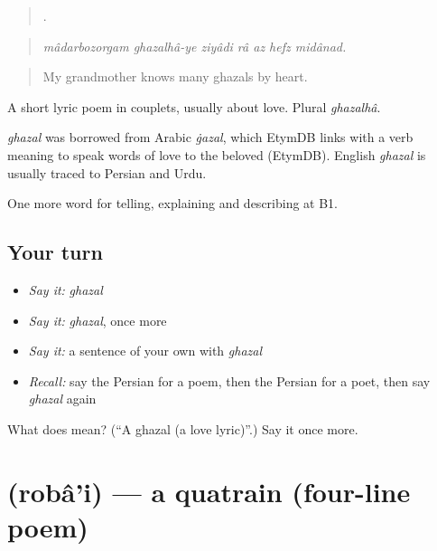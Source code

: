 \begin{quote}
      .
\end{quote}

\begin{quote}
\emph{mâdarbozorgam ghazalhâ-ye ziyâdi râ az hefz midânad.}
\end{quote}

\begin{quote}
My grandmother knows many ghazals by heart.
\end{quote}

A short lyric poem in couplets, usually about love. Plural \emph{ghazalhâ}.

\begin{cousinweb}
\emph{ghazal} was borrowed from Arabic \emph{ġazal}, which EtymDB links with a verb meaning to speak words of love to the beloved (EtymDB). English \emph{ghazal} is usually traced to Persian and Urdu.
\end{cousinweb}

\begin{grammarlens}[title={What you've built}]
One more word for telling, explaining and describing at B1.
\end{grammarlens}

\subsection*{Your turn}
\begin{itemize}
\raggedright
  \item \emph{Say it:} \emph{ghazal}
  \item \emph{Say it:} \emph{ghazal}, once more
  \item \emph{Say it:} a sentence of your own with \emph{ghazal}
  \item \emph{Recall:} say the Persian for a poem, then the Persian for a poet, then say \emph{ghazal} again
\end{itemize}

\begin{tcolorbox}[breakable,colback=teal!4,colframe=teal!35!black,title={Before you move on}]
What does  mean? (\textquotedblleft{}A ghazal (a love lyric)\textquotedblright{}.) Say it once more.
\end{tcolorbox}
\section[\texorpdfstring{\fa{رباعی} (robâ'i)}{رباعی (robâ'i)}]{ (robâ'i) — a quatrain (four-line poem)}

